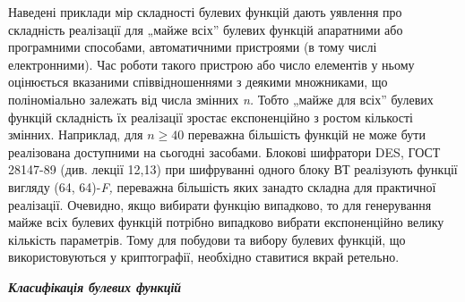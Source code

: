 \documentclass[a4paper]{article}
\newcounter{}
\begin{document}
Наведені приклади мір складності булевих функцій дають уявлення про складність
реалізації для „майже всіх” булевих функцій апаратними або програмними
способами, автоматичними пристроями (в тому числі електронними). Час роботи
такого пристрою або число елементів у ньому  оцінюється вказаними
співвідношеннями з деякими множниками, що поліноміально залежать від числа
змінних \textit{n}\textit{.} Тобто „майже для всіх” булевих функцій складність
їх реалізації зростає експоненційно з ростом кількості змінних. Наприклад, для 
${n\ge \text{40}}$ переважна більшість функцій не може бути реалізована
доступними на сьогодні засобами. Блокові шифратори DES, ГОСТ 28147-89 (див.
лекції 12,13) при шифруванні одного блоку ВТ реалізують функції вигляду (64,
64)-\textit{F}\textit{, }переважна більшість яких занадто складна для
практичної реалізації. Очевидно, якщо вибирати функцію випадково, то для
генерування майже всіх булевих функцій потрібно випадково вибрати експоненційно
велику кількість параметрів. Тому для побудови та вибору булевих функцій, що
використовуються у криптографії, необхідно ставитися вкрай ретельно.\textit{  }


\bigskip


\bigskip

{\centering\bfseries\itshape
Класифікація булевих функцій
\par}


\bigskip


\bigskip
\end{document}
